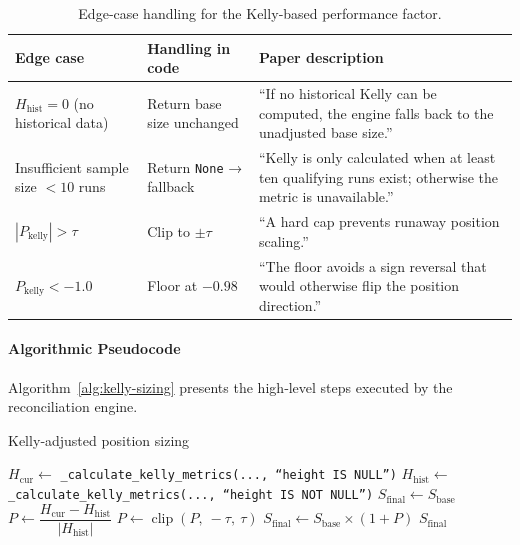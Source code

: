 \documentclass[10pt]{article}
\begin{document}
\begin{table}[t] %
\small
\centering
\caption{Edge‑case handling for the Kelly‑based performance factor.}
\label{tab:edge-cases} %
\begin{tabularx}{\textwidth}{@{} l l >{\raggedright\arraybackslash}X @{}} %
\toprule
\textbf{Edge case} & \textbf{Handling in code} & \textbf{Paper description} \\ \midrule
$H_{\text{hist}} = 0$ (no historical data) & Return base size unchanged & “If no historical Kelly can be computed, the engine falls back to the unadjusted base size.” \\
Insufficient sample size $<10$ runs & Return \texttt{None} → fallback & “Kelly is only calculated when at least ten qualifying runs exist; otherwise the metric is unavailable.” \\
$|P_{\text{kelly}}| > \tau$ & Clip to $\pm\tau$ & “A hard cap prevents runaway position scaling.” \\
$P_{\text{kelly}} < -1.0$ & Floor at $-0.98$ & “The floor avoids a sign reversal that would otherwise flip the position direction.” \\
\bottomrule
\end{tabularx}
\end{table}

\paragraph{Algorithmic Pseudocode}
Algorithm~\ref{alg:kelly-sizing} presents the high‑level steps executed by the reconciliation engine.

\begin{algorithm}[H]
\caption{Kelly‑adjusted position sizing}
\label{alg:kelly-sizing}
\begin{algorithmic}[1]
\State $H_{\text{cur}} \gets$ \texttt{\_calculate\_kelly\_metrics(..., ``height IS NULL'')}
\State $H_{\text{hist}} \gets$ \texttt{\_calculate\_kelly\_metrics(..., ``height IS NOT NULL'')}
    \State $S_{\text{final}} \gets S_{\text{base}}$
\Else
    \State $P \gets \dfrac{H_{\text{cur}} - H_{\text{hist}}}{\lvert H_{\text{hist}} \rvert}$
    \State $P \gets \operatorname{clip}(P,\ -\tau,\ \tau)$
    \State $S_{\text{final}} \gets S_{\text{base}} \times (1 + P)$
\EndIf
\State \Return $S_{\text{final}}$
\end{algorithmic}
\end{algorithm}
\end{document}
